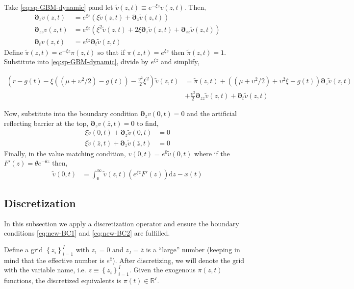 \documentclass[11pt]{article}
\newcommand{\D}[1][]{\ensuremath{\boldsymbol{\partial}_{#1}}}
\newcommand{\R}{\ensuremath{\mathbb{R}}}
\newcommand{\diff}{\ensuremath{\mathrm{d}}}
\newcommand{\set}[1]{\ensuremath{\left\{{#1}\right\}}}
\begin{document}
Take \cref{eq:sp-GBM-dynamic} pand let $\tilde{v}(z,t) \equiv e^{-\xi z}v(z,t)$.  Then,
\begin{align}
	\D[z]v(z,t) &= e^{\xi z}\left(\xi\tilde{v}(z,t) + \D[z]\tilde{v}(z,t) \right)\\
	\D[zz]v(z,t) &= e^{\xi z}\left(\xi^{2}\tilde{v}(z,t) + 2 \xi\D[z]\tilde{v}(z,t) + \D[zz]\tilde{v}(z,t)  \right)\\	
	\D[t]v(z,t) &= e^{\xi z} \D[t] \tilde{v}(z,t)
\end{align}
Define $\tilde{\pi}(z,t) = e^{-\xi z}\pi(z,t)$ so that if $\pi(z,t) = e^{\xi z}$ then $\tilde{\pi}(z,t) = 1$.  Substitute into \cref{eq:sp-GBM-dynamic}, divide by $e^{\xi z}$ and simplify,

\begin{align}
	\left(r - g(t)- \xi((\mu + \upsilon^2/2)-g(t)) - \frac{\upsilon^2}{2}\xi^2\right) \tilde{v}(z,t) &= \tilde{\pi}(z,t) + ((\mu + \upsilon^2/2) + \upsilon^2\xi - g(t)) \D[z] \tilde{v}(z,t) \nonumber \\ &+ \tfrac{\upsilon^2}{2} \D[zz] \tilde{v}(z,t) + \D[t]\tilde{v}(z,t)  \label{eq:bellman-GBM-dynamic-normalized}
\end{align}

Now, substitute into the boundary condition $\D[z]v(0,t) = 0$ and the artificial reflecting barrier at the top, $\D[z]v(\bar{z},t) = 0$ to find,
\begin{align}
	\xi\tilde{v}(0,t) + \D[z]\tilde{v}(0,t ) &= 0\label{eq:new-BC1}\\
	\xi\tilde{v}(\bar{z},t) + \D[z]\tilde{v}(\bar{z},t) &= 0\label{eq:new-BC2}
\end{align}	
Finally, in the value matching condition, $v(0,t) = e^{0}\tilde{v}(0,t)$ where if the $F'(z) = \theta e^{-\theta z}$ then,
\begin{align}
	\tilde{v}(0,t) &= \int_{0}^{\infty} \tilde{v}(z,t) \left(e^{\xi z} F'(z)\right) \diff z - x(t)\label{eq:vm-GBM-dynamic-normalized}
\end{align}	

\subsection{Discretization}

In this subsection we apply a discretization operator and ensure the boundary conditions \cref{eq:new-BC1} and \cref{eq:new-BC2} are fulfilled. 

Define a  grid $\set{z_i}_{i=1}^I$ with $z_1 = 0$ and $z_I = \bar{z}$ is a ``large'' number (keeping in mind that the effective number is $e^{\bar{z}}$).  After discretizing, we will denote the grid with the variable name, i.e. $z \equiv \set{z_i}_{i=1}^I$.  Given the exogenous $\pi(z,t)$ functions, the discretized equivalents is $\pi(t) \in \R^I$.
\end{document}

